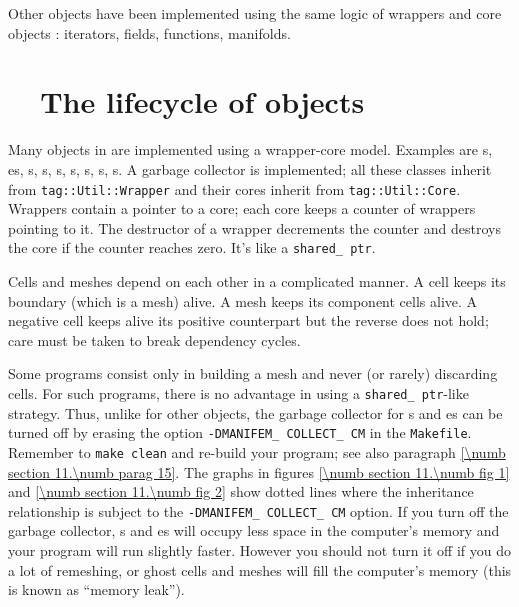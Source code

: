 Other objects have been implemented using the same logic of wrappers and core objects :
iterators, fields, functions, manifolds.

\vfil\break


\section{~~The lifecycle of objects}\label{\numb section 11.\numb parag 5}

Many objects in {\maniFEM} are implemented using a wrapper-core model.
Examples are {\small\tt{}}s, {\small\tt{}}es,
{\small\tt{}}s, {\small\tt{}}s, {\small\tt{}}s,
{\small\tt{}}s, {\small\tt{}}s, {\small\tt{}}s,%
s.
A garbage collector is implemented; all these classes inherit from
{\small\tt \textcolor{tag}{tag}::Util::Wrapper} and
their cores inherit from {\small\tt \textcolor{tag}{tag}::Util::Core}.
Wrappers contain a pointer to a core; each core keeps a counter of wrappers pointing to it.
The destructor of a wrapper decrements the counter and destroys the core if the counter
reaches zero.
It's like a {\small\tt shared\_\,ptr}.

Cells and meshes depend on each other in a complicated manner.
A cell keeps its boundary (which is a mesh) alive.
A mesh keeps its component cells alive.
A negative cell keeps alive its positive counterpart but the reverse does not hold;
care must be taken to break dependency cycles.

Some programs consist only in building a mesh and never (or rarely) discarding cells.
For such programs, there is no advantage in using a {\small\tt shared\_\,ptr}-like strategy.
Thus, unlike for other {\maniFEM} objects, the garbage collector for {\small\tt {}}s and
{\small\tt {}}es can be turned off by erasing the option
{\small\tt -DMANIFEM\_\,COLLECT\_\,CM} in the {\small\tt Makefile}.
Remember to {\small\tt make clean} and re-build your program;
see also paragraph \ref{\numb section 11.\numb parag 15}.
The graphs in figures \ref{\numb section 11.\numb fig 1} and \ref{\numb section 11.\numb fig 2}
show dotted lines where the inheritance relationship is subject to the
{\small\tt -DMANIFEM\_\,COLLECT\_\,CM} option.
If you turn off the garbage collector, {\small\tt {}}s and {\small\tt {}}es
will occupy less space in the computer's memory and your program will run slightly faster.
However you should not turn it off if you do a lot of remeshing,
or ghost cells and meshes will fill the computer's memory (this is known as ``memory leak'').

